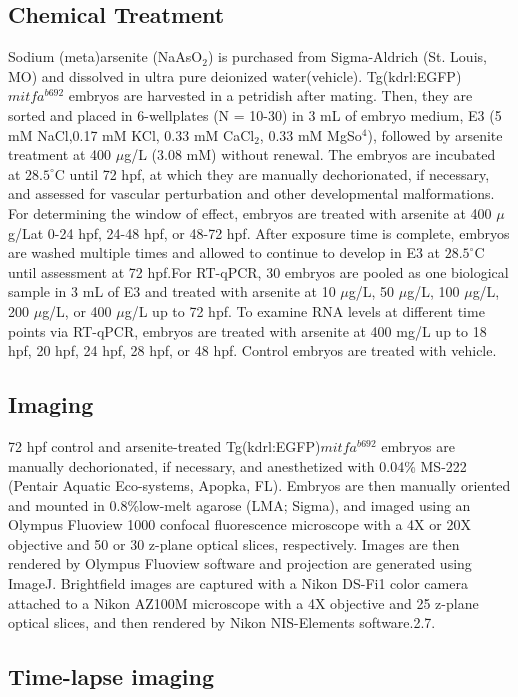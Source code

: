 \subsection{Chemical Treatment}
Sodium (meta)arsenite (NaAsO$_{2}$) is purchased from Sigma-Aldrich (St. Louis, MO) and dissolved in ultra pure deionized water(vehicle). Tg(kdrl:EGFP)$mitfa^{b692}$ embryos are harvested in a petridish after mating. Then, they are sorted and placed in 6-wellplates (N = 10-30) in 3 mL of embryo medium, E3 (5 mM NaCl,0.17 mM KCl, 0.33 mM CaCl$_{2}$, 0.33 mM MgSo$^{4}$), followed by arsenite treatment at 400 $\mu$g/L (3.08 mM) without renewal. The embryos are incubated at $28.5^{\circ}$C until 72 hpf, at which they are manually dechorionated, if necessary, and assessed for vascular perturbation and other developmental malformations. For determining the window of effect, embryos are treated with arsenite at 400 $\mu$g/Lat 0-24 hpf, 24-48 hpf, or 48-72 hpf. After exposure time is complete, embryos are washed multiple times and allowed to continue to develop in E3 at $28.5^{\circ }$C until assessment at 72 hpf.For RT-qPCR, 30 embryos are pooled as one biological sample in 3 mL of E3 and treated with arsenite at 10 $\mu$g/L, 50 $\mu$g/L, 100 $\mu$g/L, 200 $\mu$g/L, or 400 $\mu$g/L up to 72 hpf. To examine RNA levels at different time points via RT-qPCR, embryos are treated with arsenite at 400 mg/L up to 18 hpf, 20 hpf, 24 hpf, 28 hpf, or 48 hpf. Control embryos are treated with vehicle.


\subsection{Imaging}

72 hpf control and arsenite-treated Tg(kdrl:EGFP)$mitfa^{b692}$ embryos are manually dechorionated, if necessary, and anesthetized with 0.04\% MS-222 (Pentair Aquatic Eco-systems, Apopka, FL). Embryos are then manually oriented and mounted in 0.8\%low-melt agarose (LMA; Sigma), and imaged using an Olympus Fluoview 1000 confocal fluorescence microscope with a 4X or 20X objective and 50 or 30 z-plane optical slices, respectively. Images are then rendered by Olympus Fluoview software and projection are generated using ImageJ. Brightfield images are captured with a Nikon DS-Fi1 color camera attached to a Nikon AZ100M microscope with a 4X objective and 25 z-plane optical slices, and then rendered by Nikon NIS-Elements software.2.7. 

\subsection{Time-lapse imaging}

